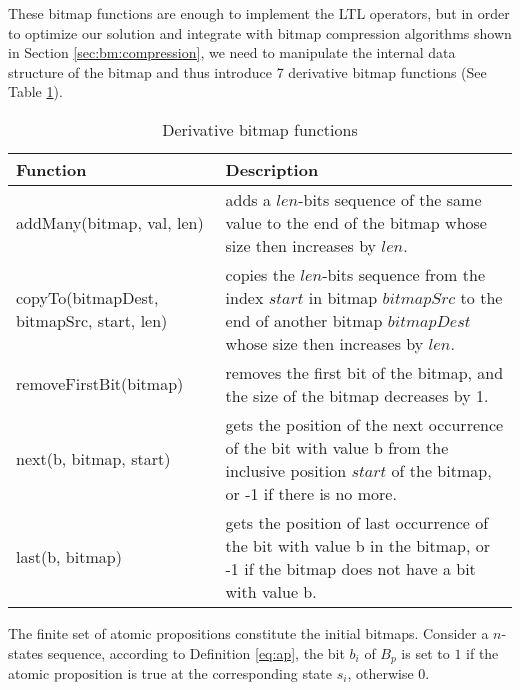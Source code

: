These bitmap functions are enough to implement the LTL operators, but in order to optimize our solution and integrate with bitmap compression algorithms shown in Section \ref{sec:bm:compression}, we need to manipulate the internal data structure of the bitmap and thus introduce 7 derivative bitmap functions (See Table \ref{tbl:bm:bmhelpers}).
\begin{table}
\centering
\begin{tabular}{|l|p{8cm}|}
\hline
Function & Description \\
\hline
addMany(bitmap, val, len) & adds a $len$-bits sequence of the same value to the end of the bitmap whose size then increases by $len$. \\
\hline
copyTo(bitmapDest, bitmapSrc, start, len) & copies the $len$-bits sequence from the index $start$ in bitmap $bitmapSrc$ to the end of another bitmap $bitmapDest$ whose size then increases by $len$. \\
\hline
removeFirstBit(bitmap) & removes the first bit of the bitmap, and the size of the bitmap decreases by 1. \\
\hline
next(b, bitmap, start) & gets the position of the next occurrence of the bit with value b from the inclusive position $start$ of the bitmap, or -1 if there is no more. \\
\hline
last(b, bitmap) & gets the position of last occurrence of the bit with value b in the bitmap, or -1 if the bitmap does not have a bit with value b. \\
\hline
\end{tabular}
\caption{Derivative bitmap functions}
\label{tbl:bm:bmhelpers}
\end{table}

The finite set of atomic propositions constitute the initial bitmaps. Consider a $n$-states sequence, according to Definition \eqref{eq:ap}, the bit $b_i$ of $B_p$ is set to $1$ if the atomic proposition is true at the corresponding state $s_i$, otherwise 0.

